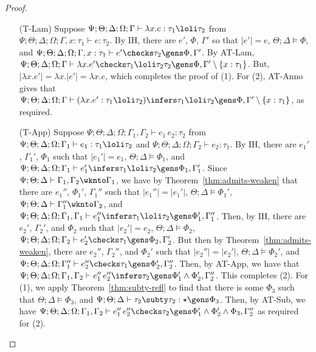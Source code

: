 \begin{proof}
\begin{itemize}
  \item[(T-Lam)] Suppose $\Psi ; \Theta ; \Delta ; \Omega ; \Gamma\vdash \lambda x.e : \tau_1 \loli \tau_2$ from $\Psi ; \Theta ; \Delta ; \Omega ; \Gamma, x : \tau_1 \vdash e : \tau_2$. By IH, there are $e'$, $\Phi$, $\Gamma'$ so that $|e'| = e$, $\Theta ; \Delta \vDash \Phi$, and $\Psi ; \Theta ; \Delta ; \Omega ; \Gamma, x : \tau_1 \vdash e' \checks \tau_2 \gens \Phi,\Gamma'$. By AT-Lam, $\Psi ; \Theta ; \Delta ; \Omega ; \Gamma \vdash \lambda x. e' \checks \tau_1 \loli \tau_2 \tau_2 \gens \Phi,\Gamma' \setminus \{x : \tau_1\}$. But, $|\lambda x. e'| = \lambda x. |e'| = \lambda x.e$, which completes the proof of (1). For (2), AT-Anno gives that $\Psi ; \Theta ; \Delta ; \Omega ; \Gamma \vdash (\lambda x. e' : \tau_1 \loli \tau_2) \infers \tau_1 \loli \tau_2 \gens \Phi,\Gamma' \setminus \{x : \tau_1\}$, as required.
  
  \item[(T-App)] Suppose $\Psi ; \Theta ; \Delta ; \Omega ; \Gamma_1,\Gamma_2\vdash e_1 \, e_2 :  \tau_2$ from
  $\Psi ; \Theta ; \Delta ; \Omega ; \Gamma_1\vdash e_1 : \tau_1 \loli \tau_2$ and
  $\Psi ; \Theta ; \Delta ; \Omega ; \Gamma_2\vdash e_2 : \tau_1$.
  By IH, there are $e_1'$, $\Gamma_1'$, $\Phi_1$ such that
  $|e_1'| = e_1$,
  $\Theta ; \Delta \vDash \Phi_1$, and
  $\Psi ; \Theta ; \Delta ; \Omega ; \Gamma_1 \vdash e_1' \infers \tau_1 \loli \tau_2 \gens \Phi_1,\Gamma_1'$.
  Since $\Psi ; \Theta ; \Delta \vdash \Gamma_1,\Gamma_2 \wknto \Gamma_1$,
  we have by Theorem~\ref{thm:admits-weaken} that there are $e_1''$, $\Phi_1'$, $\Gamma_1''$ such that
  $|e_1''| = |e_1'|$,
  $\Theta ; \Delta \vDash \Phi_1'$,
  $\Psi ; \Theta ; \Delta \vdash \Gamma_1'' \wknto \Gamma_2$, and
  $\Psi ; \Theta ; \Delta ; \Omega ; \Gamma_1,\Gamma_1 \vdash e_1'' \infers \tau_1 \loli \tau_2 \gens \Phi_1',\Gamma_1''$.
  Then, by IH, there are $e_2'$, $\Gamma_2'$, and $\Phi_2$ such that
  $|e_2'| = e_2$,
  $\Theta ; \Delta \vDash \Phi_2$,
  $\Psi ; \Theta ; \Delta ; \Omega ; \Gamma_2 \vdash e_2' \checks \tau_1 \gens \Phi_2,\Gamma_2'$.
  But then by Theorem~\ref{thm:admits-weaken}, there are $e_2''$, $\Gamma_2''$, and $\Phi_2'$ such that
  $|e_2''| = |e_2'|$,
  $\Theta ; \Delta \vDash \Phi_2'$, and
  $\Psi ; \Theta ; \Delta ; \Omega; \Gamma_1'' \vdash e_2'' \checks \tau_1 \gens \Phi_2',\Gamma_2''$.
  Then, by AT-App, we have that
  $\Psi ; \Theta ; \Delta ; \Omega ; \Gamma_1,\Gamma_2 \vdash e_1'' \, e_2'' \infers \tau_2 \gens \Phi_1' \wedge \Phi_2',\Gamma_2''$.
  This completes (2). For (1), 
  we apply Theorem~\ref{thm:subty-refl} to find that there is some $\Phi_3$ such that $\Theta ; \Delta \vDash \Phi_3$, and
  $\Psi ; \Theta ; \Delta \vdash \tau_2 \subty \tau_2 : \star \gens \Phi_3$.
  Then, by AT-Sub, we have
  $\Psi ; \Theta ; \Delta ; \Omega ; \Gamma_1,\Gamma_2 \vdash e_1'' \, e_2'' \checks \tau_2 \gens \Phi_1' \wedge \Phi_2' \wedge \Phi_3,\Gamma_2''$
  as required for (2).
  

\end{itemize}
\end{proof}
